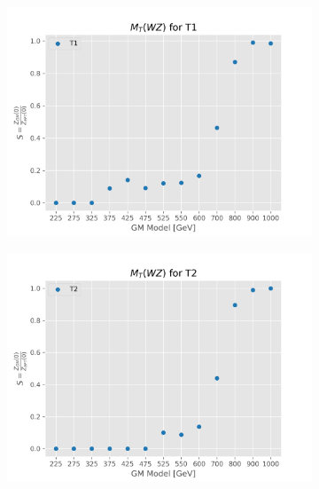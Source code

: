 \documentclass[../Bachelorarbeit.tex]{subfiles}
\begin{document}
\begin{figure}[h]
\begin{subfigure}{0.45\textwidth}
    \end{subfigure}
    \begin{subfigure}{0.45\textwidth}
        \includegraphics[width=\textwidth]{Plots/gm_relevanze/MTWZ_op_T1.png}

    \end{subfigure}
    \begin{subfigure}{0.45\textwidth}
        \includegraphics[width=\textwidth]{Plots/gm_relevanze/MTWZ_op_T2.png}

    \end{subfigure}

\end{figure}
\end{document}

